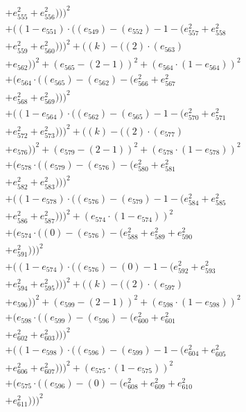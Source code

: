 \documentclass[10pt, a4paper]{article}
\begin{document}
\begin{align*}
& + e_{555}^{2} + e_{556}^{2})))^{2} \\
& + ((1 - e_{551})  \cdot  ((e_{549}) - (e_{552}) - 1 - (e_{557}^{2} + e_{558}^{2} \\
& + e_{559}^{2} + e_{560}^{2})))^{2} + ((k) - ((2)  \cdot  (e_{563}) \\
& + e_{562}))^{2} + (e_{565} - (2 - 1))^{2} + (e_{564}  \cdot  (1 - e_{564}))^{2} \\
& + (e_{564}  \cdot  ((e_{565}) - (e_{562}) - (e_{566}^{2} + e_{567}^{2} \\
& + e_{568}^{2} + e_{569}^{2})))^{2} \\
& + ((1 - e_{564})  \cdot  ((e_{562}) - (e_{565}) - 1 - (e_{570}^{2} + e_{571}^{2} \\
& + e_{572}^{2} + e_{573}^{2})))^{2} + ((k) - ((2)  \cdot  (e_{577}) \\
& + e_{576}))^{2} + (e_{579} - (2 - 1))^{2} + (e_{578}  \cdot  (1 - e_{578}))^{2} \\
& + (e_{578}  \cdot  ((e_{579}) - (e_{576}) - (e_{580}^{2} + e_{581}^{2} \\
& + e_{582}^{2} + e_{583}^{2})))^{2} \\
& + ((1 - e_{578})  \cdot  ((e_{576}) - (e_{579}) - 1 - (e_{584}^{2} + e_{585}^{2} \\
& + e_{586}^{2} + e_{587}^{2})))^{2} + (e_{574}  \cdot  (1 - e_{574}))^{2} \\
& + (e_{574}  \cdot  ((0) - (e_{576}) - (e_{588}^{2} + e_{589}^{2} + e_{590}^{2} \\
& + e_{591}^{2})))^{2} \\
& + ((1 - e_{574})  \cdot  ((e_{576}) - (0) - 1 - (e_{592}^{2} + e_{593}^{2} \\
& + e_{594}^{2} + e_{595}^{2})))^{2} + ((k) - ((2)  \cdot  (e_{597}) \\
& + e_{596}))^{2} + (e_{599} - (2 - 1))^{2} + (e_{598}  \cdot  (1 - e_{598}))^{2} \\
& + (e_{598}  \cdot  ((e_{599}) - (e_{596}) - (e_{600}^{2} + e_{601}^{2} \\
& + e_{602}^{2} + e_{603}^{2})))^{2} \\
& + ((1 - e_{598})  \cdot  ((e_{596}) - (e_{599}) - 1 - (e_{604}^{2} + e_{605}^{2} \\
& + e_{606}^{2} + e_{607}^{2})))^{2} + (e_{575}  \cdot  (1 - e_{575}))^{2} \\
& + (e_{575}  \cdot  ((e_{596}) - (0) - (e_{608}^{2} + e_{609}^{2} + e_{610}^{2} \\
& + e_{611}^{2})))^{2} \\

\end{align*}
\end{document}
